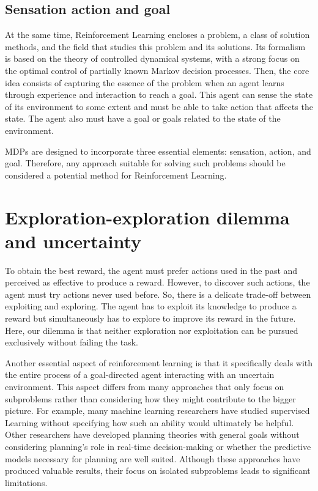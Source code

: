 \documentclass[
  letterpaper,
]{krantz}
\theoremstyle{plain}
\theoremstyle{definition}
\theoremstyle{definition}
\theoremstyle{remark}
\begin{document}
\subsection{Sensation action and goal}\label{sensation-action-and-goal}

At the same time, Reinforcement Learning encloses a problem, a class of
solution methods, and the field that studies this problem and its
solutions. Its formalism is based on the theory of controlled dynamical
systems, with a strong focus on the optimal control of partially known
Markov decision processes. Then, the core idea consists of capturing the
essence of the problem when an agent learns through experience and
interaction to reach a goal. This agent can sense the state of its
environment to some extent and must be able to take action that affects
the state. The agent also must have a goal or goals related to the state
of the environment.

MDPs are designed to incorporate three essential elements: sensation,
action, and goal. Therefore, any approach suitable for solving such
problems should be considered a potential method for Reinforcement
Learning.

\section{Exploration-exploration dilemma and
uncertainty}\label{exploration-exploration-dilemma-and-uncertainty}

To obtain the best reward, the agent must prefer actions used in the
past and perceived as effective to produce a reward. However, to
discover such actions, the agent must try actions never used before. So,
there is a delicate trade-off between exploiting and exploring. The
agent has to exploit its knowledge to produce a reward but
simultaneously has to explore to improve its reward in the future. Here,
our dilemma is that neither exploration nor exploitation can be pursued
exclusively without failing the task.

Another essential aspect of reinforcement learning is that it
specifically deals with the entire process of a goal-directed agent
interacting with an uncertain environment. This aspect differs from many
approaches that only focus on subproblems rather than considering how
they might contribute to the bigger picture. For example, many machine
learning researchers have studied supervised Learning without specifying
how such an ability would ultimately be helpful. Other researchers have
developed planning theories with general goals without considering
planning's role in real-time decision-making or whether the predictive
models necessary for planning are well suited. Although these approaches
have produced valuable results, their focus on isolated subproblems
leads to significant limitations.
\end{document}
